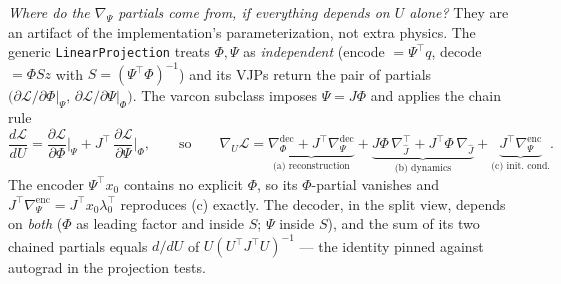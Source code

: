 \documentclass[10pt]{article}
\newcommand{\code}[1]{\colorbox{codegray}{\small\texttt{#1}}}
\newcommand{\Jhat}{\hat{J}}
\begin{document}
\emph{Where do the $\nabla_\Psi$ partials come from, if everything depends on
$U$ alone?}\; They are an artifact of the implementation's parameterization,
not extra physics. The generic \code{LinearProjection} treats $\Phi, \Psi$ as
\emph{independent} (encode $= \Psi^\top q$, decode $= \Phi S z$ with
$S = (\Psi^\top\Phi)^{-1}$) and its VJPs return the pair of partials
$\bigl(\partial\mathcal{L}/\partial\Phi\big|_\Psi,\,
\partial\mathcal{L}/\partial\Psi\big|_\Phi\bigr)$. The varcon subclass
imposes $\Psi = J\Phi$ and applies the chain rule
\begin{equation*}
    \frac{d\mathcal{L}}{dU}
    = \frac{\partial\mathcal{L}}{\partial\Phi}\bigg|_{\Psi}
    + J^\top\, \frac{\partial\mathcal{L}}{\partial\Psi}\bigg|_{\Phi} ,
    \qquad\text{so}\qquad
    \nabla_U \mathcal{L}
    = \underbrace{\nabla^{\mathrm{dec}}_{\Phi}
        + J^\top \nabla^{\mathrm{dec}}_{\Psi}}_{\text{(a) reconstruction}}
    + \underbrace{J\Phi\, \nabla_{\Jhat}^{\top}
        + J^\top \Phi\, \nabla_{\Jhat}}_{\text{(b) dynamics}}
    + \underbrace{J^\top \nabla^{\mathrm{enc}}_{\Psi}}_{\text{(c) init.\ cond.}} .
\end{equation*}
The encoder $\Psi^\top x_0$ contains no explicit $\Phi$, so its $\Phi$-partial
vanishes and $J^\top \nabla_\Psi^{\mathrm{enc}} = J^\top x_0 \lambda_0^\top$
reproduces (c) exactly. The decoder, in the split view, depends on
\emph{both} ($\Phi$ as leading factor and inside $S$; $\Psi$ inside $S$), and
the sum of its two chained partials equals $d/dU$ of
$U(U^\top J^\top U)^{-1}$ --- the identity pinned against autograd in the
projection tests.
\end{document}

